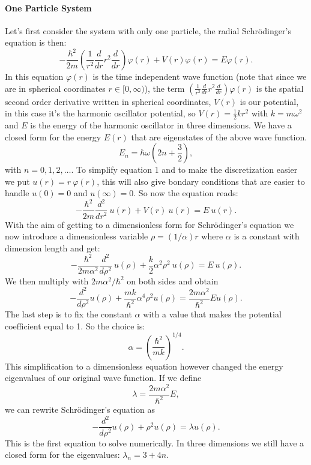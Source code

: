 \documentclass[10pt,a4paper,titlepage]{article}
\begin{document}
\paragraph*{One Particle System}
Let's first consider the system with only one particle, the radial Schr\"odinger's equation is then:
\begin{equation}
	-\frac{\hbar^2}{2 m} \left ( \frac{1}{r^2} \frac{d}{dr} r^2
  \frac{d}{dr} \right )\varphi(r) 
     + V(r) \varphi(r) = E \varphi(r).
\end{equation}
In this equation $\varphi (r)$ is the time independent wave function (note that since we are in spherical coordinates $r\in [0,\infty)$), 
the term $ \left (  \frac{1}{r^2} \frac{d}{dr} r^2 \frac{d}{dr} \right )\varphi(r) $ is the spatial second order derivative written in 
spherical coordinates, $V(r)$ is our potential, in this case it's the harmonic oscillator potential, so  $V(r) = \frac{1}{2}kr^2$ with $k=m\omega^2$ and 
$E$ is the energy of the harmonic oscillator in three dimensions. We have a closed form for the energy $E(r)$ that are eigenstates of the above wave 
function.
\[
E_{n}=  \hbar \omega \left(2n+\frac{3}{2}\right),
\]
\noindent with $n=0,1,2,\dots$. To simplify equation 1 and to make the discretization easier we put $u(r) = r~\varphi (r)$, this will also give bondary 
conditions that are easier to handle $u(0)=0$ and $u(\infty)=0$. So now the equation reads:
\begin{equation}
  -\frac{\hbar^2}{2 m} \frac{d^2}{dr^2}~u(r) + V(r)~u(r)  = E~u(r) .
\end{equation}
With the aim of getting to a dimensionless form for Schr\"odinger's equation we now introduce a dimensionless variable $\rho = (1/\alpha) r$ where 
$\alpha$ is a constant with dimension length and get:
\begin{equation}
  -\frac{\hbar^2}{2 m \alpha^2} \frac{d^2}{d\rho^2}~u(\rho) 
       + \frac{k}{2} \alpha^2\rho^2 ~ u(\rho)  = E~u(\rho) .
\end{equation}
We then multiply with $2m\alpha^2/\hbar^2$ on both sides and obtain
\begin{equation}
  -\frac{d^2}{d\rho^2} u(\rho) 
       + \frac{mk}{\hbar^2} \alpha^4\rho^2u(\rho)  = \frac{2m\alpha^2}{\hbar^2}E u(\rho) .
\end{equation}
The last step is to fix the constant $\alpha$ with a value that makes the potential coefficient equal to 1. So the choice is:
\[
\alpha = \left(\frac{\hbar^2}{mk}\right)^{1/4}.
\]
This simplification to a dimensionless equation however changed the energy eigenvalues of our original wave function. If we define 
\[
\lambda = \frac{2m\alpha^2}{\hbar^2}E,
\]
we can rewrite Schr\"odinger's equation as
\begin{equation}
  -\frac{d^2}{d\rho^2} u(\rho) + \rho^2u(\rho)  = \lambda u(\rho) .
\end{equation}
This is the first equation to solve numerically. In three dimensions we still have a closed form for the eigenvalues:
$\lambda_n = 3 + 4n$.
\end{document}
